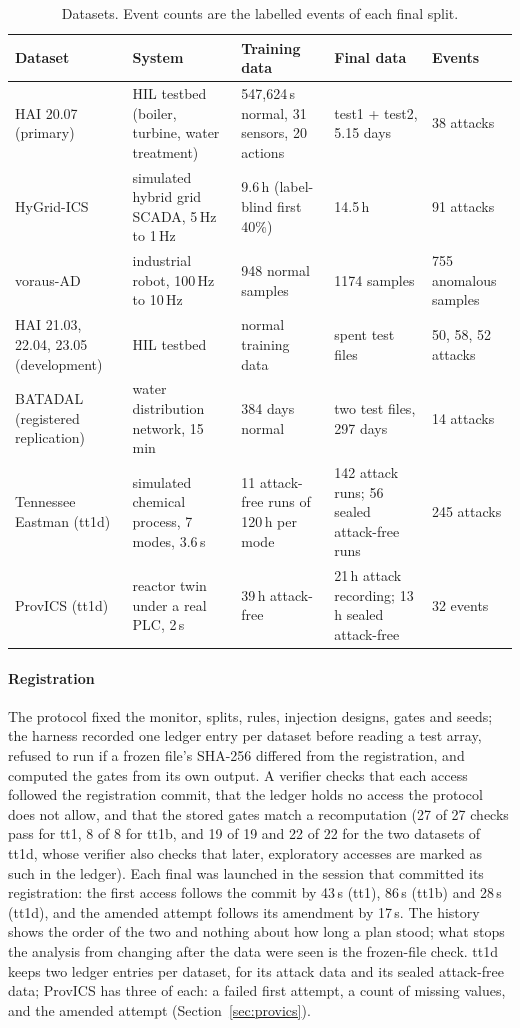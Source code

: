 \documentclass[letterpaper,twocolumn,10pt]{article}
\begin{document}
\begin{table}[t]
\caption{Datasets. Event counts are the labelled events of each final split.}
\label{tab:data}
\begin{tabularx}{\textwidth}{@{}LLLLL@{}}
\toprule
Dataset & System & Training data & Final data & Events \\
\midrule
HAI 20.07 (primary) & HIL testbed (boiler, turbine, water treatment) & 547,624\,s normal, 31 sensors, 20 actions & test1 + test2, 5.15 days & 38 attacks \\
HyGrid-ICS & simulated hybrid grid SCADA, 5\,Hz to 1\,Hz & 9.6\,h (label-blind first 40\%) & 14.5\,h & 91 attacks \\
voraus-AD & industrial robot, 100\,Hz to 10\,Hz & 948 normal samples & 1174 samples & 755 anomalous samples \\
HAI 21.03, 22.04, 23.05 (development) & HIL testbed & normal training data & spent test files & 50, 58, 52 attacks \\
BATADAL (registered replication) & water distribution network, 15\,min & 384 days normal & two test files, 297 days & 14 attacks \\
Tennessee Eastman (tt1d) & simulated chemical process, 7 modes, 3.6\,s & 11 attack-free runs of 120\,h per mode & 142 attack runs; 56 sealed attack-free runs & 245 attacks \\
ProvICS (tt1d) & reactor twin under a real PLC, 2\,s & 39\,h attack-free & 21\,h attack recording; 13\,h sealed attack-free & 32 events \\
\bottomrule
\end{tabularx}
\end{table}

\paragraph{Registration}
The protocol fixed the monitor, splits, rules, injection designs, gates and seeds; the harness
recorded one ledger entry per dataset before reading a test array, refused to run if a frozen file's
SHA-256 differed from the registration, and computed the gates from its own output. A verifier
checks that each access followed the registration commit, that the ledger holds no access the
protocol does not allow, and that the stored gates match a recomputation (27 of 27 checks pass for
tt1, 8 of 8 for tt1b, and 19 of 19 and 22 of 22 for the two datasets of tt1d, whose verifier also
checks that later, exploratory accesses are marked as such in the ledger). Each final was launched
in the session that committed its registration: the first access follows the commit by 43\,s (tt1),
86\,s (tt1b) and 28\,s (tt1d), and the amended attempt follows its amendment by 17\,s. The history shows
the order of the two and nothing about how long a plan stood; what stops the analysis from changing
after the data were seen is the frozen-file check. tt1d keeps two ledger
entries per dataset, for its attack data and its sealed attack-free data; ProvICS has three of each: a
failed first attempt, a count of missing values, and the amended attempt (Section~\ref{sec:provics}).
\end{document}
